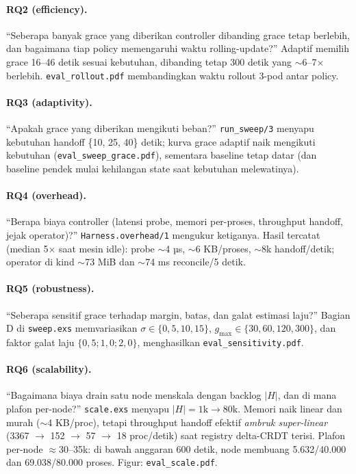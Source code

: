 \documentclass[11pt]{article}
\newcommand{\code}[1]{\texttt{\small #1}}
\begin{document}
\paragraph{RQ2 (efficiency).} ``Seberapa banyak grace yang diberikan controller dibanding grace tetap
berlebih, dan bagaimana tiap policy memengaruhi waktu rolling-update?'' Adaptif memilih grace 16--46
detik sesuai kebutuhan, dibanding tetap 300 detik yang $\sim$6--7$\times$ berlebih.
\code{eval\_rollout.pdf} membandingkan waktu rollout 3-pod antar policy.

\paragraph{RQ3 (adaptivity).} ``Apakah grace yang diberikan mengikuti beban?'' \code{run\_sweep/3}
menyapu kebutuhan handoff \{10, 25, 40\} detik; kurva grace adaptif naik mengikuti kebutuhan
(\code{eval\_sweep\_grace.pdf}), sementara baseline tetap datar (dan baseline pendek mulai kehilangan
state saat kebutuhan melewatinya).

\paragraph{RQ4 (overhead).} ``Berapa biaya controller (latensi probe, memori per-proses, throughput
handoff, jejak operator)?'' \code{Harness.overhead/1} mengukur ketiganya. Hasil tercatat (median 5×
saat mesin idle): probe $\sim$4 µs, $\sim$6 KB/proses, $\sim$8k handoff/detik; operator di kind
$\sim$73 MiB dan $\sim$74 ms reconcile/5 detik.

\paragraph{RQ5 (robustness).} ``Seberapa sensitif grace terhadap margin, batas, dan galat estimasi
laju?'' Bagian D di \code{sweep.exs} memvariasikan $\sigma \in \{0,5,10,15\}$, $g_{\max} \in \{30,60,
120,300\}$, dan faktor galat laju $\{0{,}5; 1{,}0; 2{,}0\}$, menghasilkan \code{eval\_sensitivity.pdf}.

\paragraph{RQ6 (scalability).} ``Bagaimana biaya drain satu node menskala dengan backlog $|H|$, dan di
mana plafon per-node?'' \code{scale.exs} menyapu $|H| = 1\text{k} \rightarrow 80\text{k}$. Memori naik
linear dan murah ($\sim$4 KB/proc), tetapi throughput handoff efektif \emph{ambruk super-linear}
(3367 $\rightarrow$ 152 $\rightarrow$ 57 $\rightarrow$ 18 proc/detik) saat registry delta-CRDT terisi.
Plafon per-node $\approx$30--35k: di bawah anggaran 600 detik, node membuang 5.632/40.000 dan
69.038/80.000 proses. Figur: \code{eval\_scale.pdf}.
\end{document}
